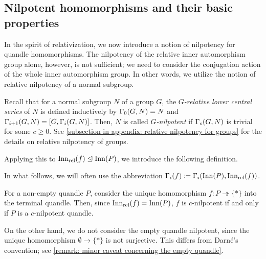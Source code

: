 \subsection{Nilpotent homomorphisms and their basic properties}
\label{subsection: nilpotent homomorphisms and their basic properties}

In the spirit of relativization, we now introduce a notion of nilpotency for quandle homomorphisms. The nilpotency of the relative inner automorphism group alone, however, is not sufficient; we need to consider the conjugation action of the whole inner automorphism group. In other words, we utilize the notion of relative nilpotency of a normal subgroup.

Recall that for a normal subgroup $N$ of a group $G$, the \emph{$G$-relative lower central series} of $N$ is defined inductively by $\Gamma_0(G,N)=N$ and $\Gamma_{i+1}(G,N)=[G,\Gamma_i(G,N)]$. 
Then, $N$ is called \emph{$G$-nilpotent} if $\Gamma_c(G,N)$ is trivial for some $c\geq 0$. See \cref{subsection in appendix: relative nilpotency for groups} for the details on relative nilpotency of groups.

Applying this to $\operatorname{Inn_{rel}}(f)\trianglelefteq\operatorname{Inn}(P)$, we introduce the following definition.


In what follows, we will often use the abbreviation $\Gamma_i(f)\coloneqq \Gamma_i(\operatorname{Inn}(P),\operatorname{Inn_{rel}}(f))$.


\begin{eg}
    For a non-empty quandle $P$, consider the unique homomorphism $f\colon P\twoheadrightarrow\{\ast\}$ into the terminal quandle. Then, since $\operatorname{Inn_{rel}}(f) = \operatorname{Inn}(P)$, $f$ is $c$-nilpotent if and only if $P$ is a $c$-nilpotent quandle.

    On the other hand, we do not consider the empty quandle nilpotent, since the unique homomorphism $\emptyset\to\{\ast\}$ is not surjective. This differs from Darn\'e's convention; see \cref{remark: minor caveat concerning the empty quandle}.
\end{eg}


